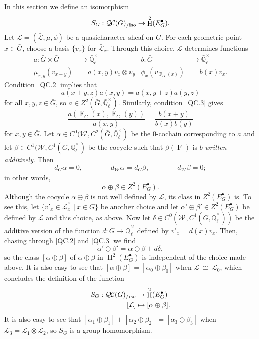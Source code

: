 \documentclass{amsart}
\theoremstyle{plain}
\theoremstyle{definition}
\theoremstyle{remark}
\newcommand{\EE}{\mathbb{\bar Q}_\ell}
\newcommand{\EEx}{\EE^\times}
\newcommand{\Weil}[1]{\mathcal{W}_{#1}}
\newcommand{\Frob}[1]{\operatorname{F}_{#1}}
\DeclareMathOperator{\Hh}{H}
\newcommand{\tq}{{\ \vert\ }}
\newcommand{\iso}{{\ \cong\ }}
\newcommand{\qcs}[1]{{\mathcal{#1}}}
\newcommand{\gqcs}[1]{{\mathcal{\bar #1}}}
\newcommand{\QC}{{\mathcal{Q\hskip-0.8pt C}}}
\newcommand{\QCiso}[1]{\QC(#1)_{/\text{iso}}}
\begin{document}
In this section we define an isomorphism
\[
S_G : \QCiso{G} \to \Hh^2(E^\bullet_G).
\]
Let $\qcs{L} = (\gqcs{L},\mu,\phi)$ be a quasicharacter sheaf on $G$.
For each geometric point $x\in {\bar G}$, choose a basis $\{ v_x \}$ for $\gqcs{L}_x$.
Through this choice, $\qcs{L}$ determines functions
\begin{align*}
a : {\bar G}\times {\bar G} &\to \EEx & b : {\bar G} &\to \EEx \\
\mu_{x,y}(v_{x+y}) &= a(x,y) v_x \otimes v_y & \phi_x(v_{\Frob{G}(x)}) &= b(x) v_x.
\end{align*}
Condition~\ref{QC.2} implies that
\begin{equation}\label{2-cocyle}
a(x+y,z) a(x,y) = a(x,y+z) a(y,z)
\end{equation}
for all $x,y,z\in {\bar G}$, so $a \in Z^2({\bar G},\EEx)$.  Similarly, condition~\ref{QC.3} gives
\begin{equation}\label{nohom}
\frac{a(\Frob{G}(x),\Frob{G}(y))}{a(x,y)} =  \frac{b(x+y)}{b(x) b(y)}
\end{equation}
for $x, y \in {\bar G}$.
Let $\alpha \in C^0(\Weil{},C^2({\bar G},\EEx)$ be the $0$-cochain corresponding to $a$ and let $\beta\in C^1(\Weil{},C^1({\bar G},\EEx)$ be the cocycle such that $\beta(\Frob{})$ is $b$ \emph{written additively}.
Then
\[
d_G\alpha =0, \qquad\qquad
d_{\Weil{}} \alpha = d_{G} \beta,\qquad\qquad
d_{\Weil{}} \beta =0;
\]
in other words,
\[\alpha\oplus \beta \in Z^2(E^\bullet_G).\]
Although the cocycle $\alpha\oplus \beta$ is not well defined by $\qcs{L}$, its class in $Z^2(E^\bullet_G)$ is.
To see this, let $\{ v'_x \in \gqcs{L}_x^\times \tq x \in {\bar G}\}$ be another choice and let $\alpha'\oplus \beta' \in Z^2(E^\bullet_G)$ be defined by $\qcs{L}$ and this choice, as above.
Now let $\delta \in C^0(\Weil{},C^1({\bar G},\EEx))$ be the additive version of the function $d : {\bar G}\to \EEx$ defined by $v'_x = d(x) v_x$.
Then, chasing through \ref{QC.2} and \ref{QC.3} we find
\[
\alpha'\oplus\beta' = \alpha\oplus\beta + d\delta,
\]
so the class $[\alpha\oplus\beta]$ of $\alpha\oplus\beta$ in $\Hh^2(E^\bullet_G)$ is independent of the choice made above. It is also easy to see that $[\alpha\oplus\beta] = [\alpha_0\oplus\beta_0]$ when $\qcs{L} \iso \qcs{L}_0$,
which concludes the definition of the function
\begin{align*}
S_G : \QCiso{G} &\to \Hh^2(E^\bullet_G)\\
[\qcs{L}] &\mapsto [\alpha\oplus \beta].
\end{align*}
It is also easy to see that $[\alpha_1\oplus\beta_1] + [\alpha_2\oplus\beta_2] = [\alpha_3\oplus\beta_3]$ when $\qcs{L}_3 = \qcs{L}_1\otimes \qcs{L}_2$, so $S_G$ is a group homomorphism.
\end{document}
